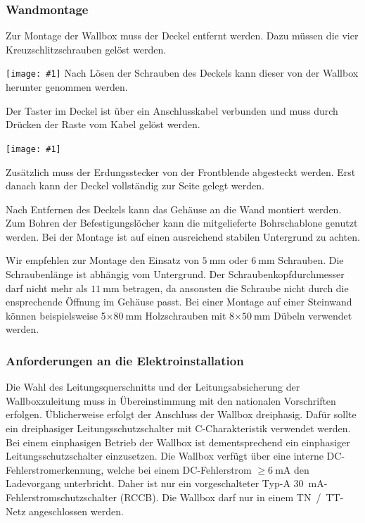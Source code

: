 \documentclass[a4paper,10pt]{article}
\newcommand{\hint}[1]{\begin{tcolorbox}[colback=boxgray,colframe=black,coltext=
white,title=Hinweis,left*=2mm,right*=2mm,boxsep=1mm,bottom=1mm,top=1mm]#1\end{tcolorbox}}
\newcommand{\gfx}[1]{\texttt{[image: \#1]}}
\begin{document}
\begin{multicols*}{2}
	\subsubsection{Wandmontage}\label{wandmontage}
	Zur Montage der Wallbox muss der Deckel entfernt werden. Dazu müssen die
	vier Kreuzschlitzschrauben gelöst werden.

	\gfx{./img_warp2/resized/warp_screw_points_ready}
	Nach Lösen der Schrauben des Deckels kann dieser von der Wallbox herunter genommen
	werden.

	\hint{Der Taster im Deckel ist über ein Anschlusskabel verbunden und muss
		durch Drücken der Raste vom Kabel gelöst werden.}

	\gfx{./img_warp2/resized/warp2_button_and_gnd_600}

	Zusätzlich muss der Erdungsstecker von der Front\-blende abgesteckt werden.
	Erst danach kann der Deckel vollständig zur Seite gelegt werden.

	Nach Entfernen des Deckels kann das Gehäuse an die Wand montiert werden. Zum
	Bohren der Befestigungslöcher kann die mitgelieferte Bohrschablone genutzt
	werden. Bei der Montage ist auf einen ausreichend stabilen Untergrund zu
	achten.

	Wir empfehlen zur Montage den Einsatz von $\SI{5}{\milli\meter}$ oder 
	$\SI{6}{\milli\meter}$ Schrauben. Die Schraubenlänge ist abhängig vom
	Untergrund. Der Schraubenkopfdurchmesser darf nicht mehr als
	$\SI{11}{\milli\meter}$ betragen, da ansonsten die Schraube nicht durch die
	ensprechende Öffnung im Gehäuse passt. Bei einer Montage auf einer Steinwand
	können beispielsweise 5$\times\SI{80}{\milli\meter}$ Holzschrauben
	mit 8$\times\SI{50}{\milli\meter}$ Dübeln  verwendet werden.

	\subsubsection{Anforderungen an die Elektroinstallation}
	Die Wahl des Leitungsquerschnitts und der Lei\-tungs\-ab\-sicher\-ung der
	Wallboxzuleitung muss in Übereinstimmung mit den nationalen Vorschriften
	erfolgen. Üblicherweise erfolgt der Anschluss der Wallbox dreiphasig.
	Dafür sollte ein dreiphasiger Leitungsschutzschalter mit C-Charakteristik
	verwendet werden. Bei einem einphasigen Betrieb der Wallbox ist
	dementsprechend ein einphasiger Leitungsschutzschalter einzusetzen.
	Die Wallbox verfügt über eine interne DC-Fehlerstromerkennung, welche
	bei einem DC-Fehlerstrom $\geq \SI{6}{\milli\ampere}$ den Ladevorgang
	unterbricht. Daher ist nur ein vorgeschalteter Typ-A \SI{30}{\milli\ampere}-Fehlerstromschutzschalter (RCCB).
	Die Wallbox darf nur in einem TN~/~TT-Netz angeschlossen werden.


\end{multicols*}
\end{document}
